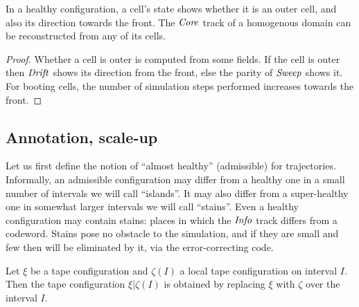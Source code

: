 \documentclass[11pt]{memoir}
\theoremstyle{definition} %
\newcommand{\fld}[1]{\ensuremath{\textit{#1\/}}}
\newcommand{\Core}{\fld{Core}}
\newcommand{\Drift}{\fld{Drift}}
\newcommand{\Info}{\fld{Info}}
\newcommand{\Sweep}{\fld{Sweep}} %
\begin{document}
\begin{lemma}\label{lem:infer-between}
In a healthy configuration, 
a cell's state shows whether it is an outer cell, and also its direction towards the front.
The \( \Core \) track of a homogenous domain can be reconstructed from any of its cells.
\end{lemma}
\begin{proof}
Whether a cell is outer is computed from some fields.
If the cell is outer then \( \Drift \) shows its direction from the front,
else the parity of \( \Sweep \) shows it.
For booting cells, the number of simulation steps performed increases towards the front.
\end{proof}

\subsection{Annotation, scale-up}\label{sec:annotation,scale-up}

Let us first define the notion of ``almost healthy'' (admissible) for trajectories.
Informally, an admissible configuration may differ from a healthy one in a small number
of intervals we will call ``islands''.
It may also differ from a super-healthy one in somewhat larger intervals we will call ``stains''.
Even a healthy configuration may contain stains: places in which the \( \Info \) track differs from
a codeword.
Stains pose no obstacle to the simulation, and if they are small and few then
will be eliminated by it, via the error-correcting code.

\begin{definition}
\label{def:local-config}
  Let \( \xi \) be a tape configuration and \( \zeta(I) \) a local
  tape  configuration on interval \( I \).
  Then the tape configuration \( \xi\vert\zeta(I) \) is obtained by
  replacing \( \xi \) with \( \zeta \) over the interval \( I \).
\end{definition}
\end{document}
